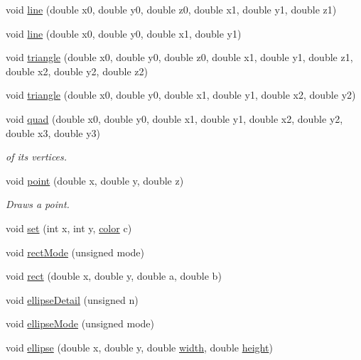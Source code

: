 \begin{DoxyCompactItemize}
void \hyperlink{namespacecprocessing_a22b5de4fc02daa5ad47f4f277465cc18}{line} (double x0, double y0, double z0, double x1, double y1, double z1)
\item 
void \hyperlink{namespacecprocessing_a199a958db5fcfb43dd16829e4342036f}{line} (double x0, double y0, double x1, double y1)
\item 
void \hyperlink{namespacecprocessing_af3cfb92d80a8efb01c014202a10f75f6}{triangle} (double x0, double y0, double z0, double x1, double y1, double z1, double x2, double y2, double z2)
\item 
void \hyperlink{namespacecprocessing_acaf82751989b6b6c5bf80f8f4f5a79a9}{triangle} (double x0, double y0, double x1, double y1, double x2, double y2)
\item 
void \hyperlink{namespacecprocessing_a0e705161c014a71dc629afb6237076cd}{quad} (double x0, double y0, double x1, double y1, double x2, double y2, double x3, double y3)
\begin{DoxyCompactList}\small\item\em of its vertices. \end{DoxyCompactList}\item 
void \hyperlink{namespacecprocessing_a2620e23fb7246c11aec8053b799ca391}{point} (double x, double y, double z)
\begin{DoxyCompactList}\small\item\em \-Draws a point. \end{DoxyCompactList}\item 
void \hyperlink{namespacecprocessing_a26595ae3ade8670ae1bf29a3637fc284}{set} (int x, int y, \hyperlink{classcprocessing_1_1color}{color} c)
\item 
void \hyperlink{namespacecprocessing_aa095baf1d8906e76226793542e9ebcc4}{rect\-Mode} (unsigned mode)
\item 
void \hyperlink{namespacecprocessing_ae674c2ae8ba8fdf8859addfe239c90be}{rect} (double x, double y, double a, double b)
\item 
void \hyperlink{namespacecprocessing_a4647a1b4d440f504e7d2b52866f58c3a}{ellipse\-Detail} (unsigned n)
\item 
void \hyperlink{namespacecprocessing_a8b3c72101215d89722a6fd09036c090e}{ellipse\-Mode} (unsigned mode)
\item 
void \hyperlink{namespacecprocessing_a9341930ee0fb1ee76a95e311b74e3065}{ellipse} (double x, double y, double \hyperlink{namespacecprocessing_a7af937eb8772235def57fcadd10fc82a}{width}, double \hyperlink{namespacecprocessing_ac392753eef02e2ad4ad84f5a076919be}{height})

\end{DoxyCompactItemize}
